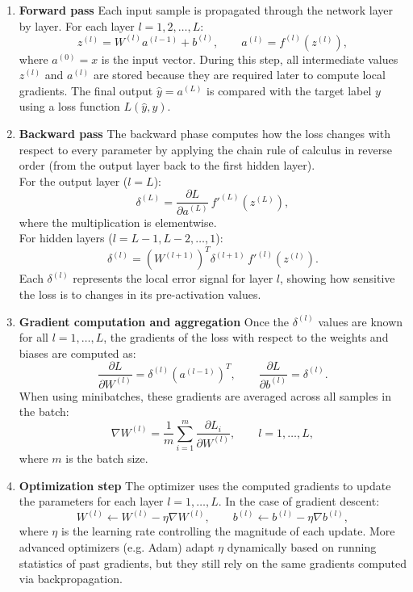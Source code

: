 \begin{enumerate}
    \item \textbf{Forward pass}  
    Each input sample is propagated through the network layer by layer.  
    For each layer $l = 1, 2, \dots, L$:
    \[
    z^{(l)} = W^{(l)} a^{(l-1)} + b^{(l)}, \qquad a^{(l)} = f^{(l)}(z^{(l)}),
    \]
    where $a^{(0)} = x$ is the input vector.  
    During this step, all intermediate values $z^{(l)}$ and $a^{(l)}$ are stored because they are required later to compute local gradients.  
    The final output $\hat{y} = a^{(L)}$ is compared with the target label $y$ using a loss function $L(\hat{y}, y)$.

    \item \textbf{Backward pass}  
    The backward phase computes how the loss changes with respect to every parameter by applying the chain rule of calculus in reverse order (from the output layer back to the first hidden layer).  \\
    For the output layer ($l = L$):
    \[
    \delta^{(L)} = \frac{\partial L}{\partial a^{(L)}} \, f'^{(L)}(z^{(L)}),
    \]
    where the multiplication is elementwise.  \\
    For hidden layers ($l = L-1, L-2, \dots, 1$):
    \[
    \delta^{(l)} = (W^{(l+1)})^T \delta^{(l+1)} \, f'^{(l)}(z^{(l)}).
    \]
    Each $\delta^{(l)}$ represents the local error signal for layer $l$, showing how sensitive the loss is to changes in its pre-activation values.

    \item \textbf{Gradient computation and aggregation}  
    Once the $\delta^{(l)}$ values are known for all $l = 1, \dots, L$, the gradients of the loss with respect to the weights and biases are computed as:
    \[
    \frac{\partial L}{\partial W^{(l)}} = \delta^{(l)} (a^{(l-1)})^T, \qquad
    \frac{\partial L}{\partial b^{(l)}} = \delta^{(l)}.
    \]
    When using minibatches, these gradients are averaged across all samples in the batch:
    \[
    \nabla W^{(l)} = \frac{1}{m} \sum_{i=1}^{m} \frac{\partial L_i}{\partial W^{(l)}}, \qquad l = 1, \dots, L,
    \]
    where $m$ is the batch size.

    \item \textbf{Optimization step}  
    The optimizer uses the computed gradients to update the parameters for each layer $l = 1, \dots, L$.  
    In the case of gradient descent:
    \[
    W^{(l)} \leftarrow W^{(l)} - \eta \nabla W^{(l)}, \qquad
    b^{(l)} \leftarrow b^{(l)} - \eta \nabla b^{(l)},
    \]
    where $\eta$ is the learning rate controlling the magnitude of each update.  
    More advanced optimizers (e.g. Adam) adapt $\eta$ dynamically based on running statistics of past gradients, but they still rely on the same gradients computed via backpropagation.


\end{enumerate}
